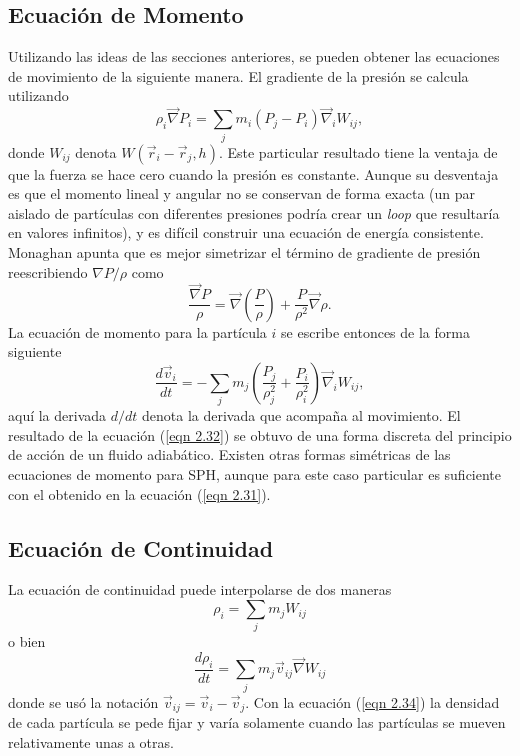 \documentclass[a4paper,openright,12pt]{book}
\begin{document}
\subsection{Ecuación de Momento}
Utilizando las ideas de las secciones anteriores, se pueden obtener las ecuaciones de movimiento de la siguiente manera. El gradiente de la presión se calcula utilizando 
\begin{equation}
\rho_{i} \vec{\nabla} P_{i}
=
\sum_{j} m_{i} (P_{j}-P_{i})\vec{\nabla}_{i}W_{ij},\label{eqn 2.30}
\end{equation}
donde $W_{ij}$ denota $W(\vec{r}_{i}-\vec{r}_{j},h)$. Este particular resultado tiene la ventaja de que la fuerza se hace cero cuando la presión es constante. Aunque su desventaja es que el momento lineal y angular no se conservan de forma exacta (un par aislado de partículas con diferentes presiones podría crear un \textit{loop} que resultaría en valores infinitos), y es difícil construir una ecuación de energía consistente. Monaghan apunta que es mejor simetrizar el término de gradiente de presión reescribiendo $\nabla P / \rho$ como 
\begin{equation}
\frac{\vec{\nabla} P}{\rho} 
=
\vec{\nabla} \left(\frac{P}{\rho}\right)
+ \frac{P}{\rho^{2}}\vec{\nabla}\rho.\label{eqn 2.31}
\end{equation}
La ecuación de momento para la partícula $i$ se escribe entonces de la forma siguiente
\begin{equation}
\frac{d \vec{v}_{i}}{d t}
=
- \sum_{j} m_{j} 
\left(\frac{P_{j}}{\rho_{j}^{2}}+ \frac{P_{i}}{\rho_{i}^{2}}\right)
\vec{\nabla}_{i}W_{ij}, \label{eqn 2.32}
\end{equation}
aquí la derivada $d/dt$ denota la derivada que acompaña al movimiento. El resultado de la ecuación (\ref{eqn 2.32}) se obtuvo de una forma discreta del principio de acción de un fluido adiabático. Existen otras formas simétricas de las ecuaciones de momento para SPH, aunque para este caso particular es suficiente con el obtenido en la ecuación (\ref{eqn 2.31}).

\subsection{Ecuación de Continuidad}
La ecuación de continuidad puede interpolarse de dos maneras
\begin{equation}
\rho_{i}=\sum_{j}m_{j}W_{ij}\label{eqn 2.33}
\end{equation}
o bien
\begin{equation}
\frac{d\rho_{i}}{d t}
=
\sum_{j}m_{j}\vec{v}_{ij}\vec{\nabla}W_{ij}\label{eqn 2.34}
\end{equation}
donde se usó la notación $\vec{v}_{ij} = \vec{v}_{i}-\vec{v}_{j}$. Con la ecuación (\ref{eqn 2.34}) la densidad de cada partícula se pede fijar y varía solamente cuando las partículas se mueven relativamente unas a otras.
\end{document}
